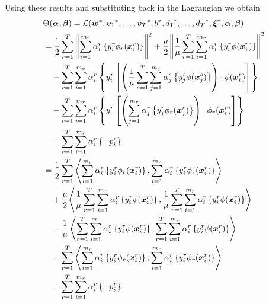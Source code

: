 Using these results and substituting back in the Lagrangian we obtain
\begin{equation}\nonumber
    \begin{aligned}
        &  \Theta(\fv{\alpha}, \fv{\beta}) =  \lagr(\optim{\fv{w}}, \optim{\fv{v}_1}, \ldots, \optim{\fv{v}_\ntasks}, \optim{b}, \optim{d_1}, \ldots, \optim{d_\ntasks}, \optim{\fv{\xi}}, \fv{\alpha}, \fv{\beta})\\
        &=  \frac{1}{2} \sum_{r= 1}^T{\norm{\sum_{i=1}^{m_r} {\alpha_i^r} \left\lbrace y_i^r \phi_r(\fv{x}_i^r) \right\rbrace}^2} + \frac{\mu}{2} {\norm{ \frac{1}{\mu}\sum_{r= 1}^T \sum_{i=1}^{m_r} {\alpha_i^r} \left\lbrace y_i^r \phi(\fv{x}_i^r) \right\rbrace}}^2 \\
        &\quad -  \sum_{r= 1}^T \sum_{i=1}^{m_r} \alpha_i^r \left\lbrace y_{i}^r \left[ \left(\frac{1}{\mu} \sum_{s= 1}^T \sum_{j=1}^{m_s} {\alpha_j^s} \left\lbrace y_j^s \phi(\fv{x}_j^s) \right\rbrace \right) \cdot \phi(\fv{x}_{i}^r) \right]  \right\rbrace \\
        &\quad -  \sum_{r= 1}^T \sum_{i=1}^{m_r} \alpha_i^r \left\lbrace y_{i}^r \left[  \left( \sum_{j=1}^{m_r} {\alpha_j^r} \left\lbrace y_j^r \phi_r(\fv{x}_j^r) \right\rbrace \right) \cdot \phi_r(\fv{x}_{i}^r)  \right]  \right\rbrace \\
        &\quad -  \sum_{r= 1}^T \sum_{i=1}^{m_r} \alpha_i^r \left\lbrace - p_{i}^r  \right\rbrace \\
        &=  \frac{1}{2} \sum_{r= 1}^T{\dotp{\sum_{i=1}^{m_r} {\alpha_i^r} \left\lbrace y_i^r \phi_r(\fv{x}_i^r) \right\rbrace}{\sum_{i=1}^{m_r} {\alpha_i^r} \left\lbrace y_i^r \phi_r(\fv{x}_i^r) \right\rbrace}} \\
        &\quad + \frac{\mu}{2} {\dotp{ \frac{1}{\mu}\sum_{r= 1}^T \sum_{i=1}^{m_r} {\alpha_i^r} \left\lbrace y_i^r \phi(\fv{x}_i^r) \right\rbrace}{ \frac{1}{\mu}\sum_{r= 1}^T \sum_{i=1}^{m_r} {\alpha_i^r} \left\lbrace y_i^r \phi(\fv{x}_i^r) \right\rbrace}} \\
        &\quad - \frac{1}{\mu} \dotp{ \sum_{r= 1}^T \sum_{i=1}^{m_r} {\alpha_i^r} \left\lbrace y_i^r \phi(\fv{x}_i^r) \right\rbrace}{ \sum_{r= 1}^T \sum_{i=1}^{m_r} {\alpha_i^r} \left\lbrace y_i^r \phi(\fv{x}_i^r) \right\rbrace} \\
        &\quad -  \sum_{r= 1}^T {\dotp{\sum_{i=1}^{m_r} {\alpha_i^r} \left\lbrace y_i^r \phi_r(\fv{x}_i^r) \right\rbrace}{\sum_{i=1}^{m_r} {\alpha_i^r} \left\lbrace y_i^r \phi_r(\fv{x}_i^r) \right\rbrace}} \\
        &\quad -  \sum_{r= 1}^T \sum_{i=1}^{m_r} \alpha_i^r \left\lbrace - p_{i}^r  \right\rbrace \\

\end{aligned}
\end{equation}
